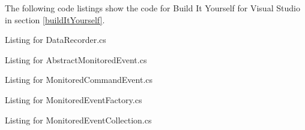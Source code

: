 The following code listings show the code for Build It Yourself for Visual Studio in section \ref{buildItYourself}.

Listing for DataRecorder.cs


\newpage
Listing for AbstractMonitoredEvent.cs


\newpage
Listing for MonitoredCommandEvent.cs


\newpage
Listing for MonitoredEventFactory.cs


\newpage
Listing for MonitoredEventCollection.cs


